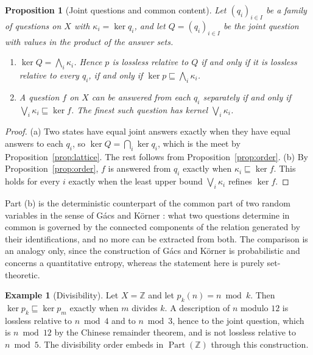 \documentclass[11pt]{article}
\newtheorem{proposition}[theorem]{Proposition}
\theoremstyle{definition}
\newtheorem{example}[theorem]{Example}
\theoremstyle{remark}
\newcommand{\Part}{\operatorname{Part}}
\newcommand{\refines}{\sqsubseteq}
\newcommand{\bigmeet}{\bigwedge}
\newcommand{\bigjoin}{\bigvee}
\begin{document}
\begin{proposition}[Joint questions and common content]\label{prop:joint}
Let $(q_i)_{i\in I}$ be a family of questions on $X$ with $\kappa_i=\ker q_i$, and let $Q=(q_i)_{i\in I}$ be the joint question with values in the product of the answer sets.
\begin{enumerate}
\item[\textup{(a)}] $\ker Q=\bigmeet_{i}\kappa_i$. Hence $p$ is lossless relative to $Q$ if and only if it is lossless relative to every $q_i$, if and only if $\ker p\refines\bigmeet_i\kappa_i$.
\item[\textup{(b)}] A question $f$ on $X$ can be answered from each $q_i$ separately if and only if $\bigjoin_i\kappa_i\refines\ker f$. The finest such question has kernel $\bigjoin_i\kappa_i$.
\end{enumerate}
\end{proposition}

\begin{proof}
(a) Two states have equal joint answers exactly when they have equal answers to each $q_i$, so $\ker Q=\bigcap_i\ker q_i$, which is the meet by Proposition~\ref{prop:lattice}. The rest follows from Proposition~\ref{prop:order}. (b) By Proposition~\ref{prop:order}, $f$ is answered from $q_i$ exactly when $\kappa_i\refines\ker f$. This holds for every $i$ exactly when the least upper bound $\bigjoin_i\kappa_i$ refines $\ker f$.
\end{proof}

Part (b) is the deterministic counterpart of the common part of two random variables in the sense of G\'acs and K\"orner \cite{gacs}: what two questions determine in common is governed by the connected components of the relation generated by their identifications, and no more can be extracted from both. The comparison is an analogy only, since the construction of G\'acs and K\"orner is probabilistic and concerns a quantitative entropy, whereas the statement here is purely set-theoretic.

\begin{example}[Divisibility]
Let $X=\mathbb Z$ and let $p_k(n)=n\bmod k$. Then $\ker p_k\refines\ker p_m$ exactly when $m$ divides $k$. A description of $n$ modulo $12$ is lossless relative to $n\bmod 4$ and to $n\bmod 3$, hence to the joint question, which is $n\bmod 12$ by the Chinese remainder theorem, and is not lossless relative to $n\bmod 5$. The divisibility order embeds in $\Part(\mathbb Z)$ through this construction.
\end{example}
\end{document}
